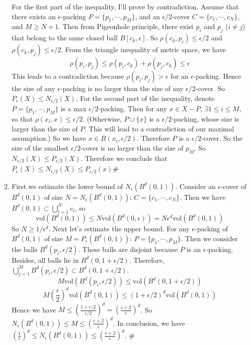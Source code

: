 \documentclass[twoside,11pt]{homework}
\begin{document}
\begin{enumerate}
      For the first part of the inequality, I'll prove by contradiction. Assume that there exists an $\epsilon$-packing $P=\{p_1,\cdots,p_M\}$, and an $\epsilon/2$-cover $C = \{c_1, \cdots,c_N \}$, and $M \geq N+1$. Then from Pigeonhole principle, there exist $p_i$ and $p_j$ ($i \neq j$) that belong to the same closed ball $B[c_k, \epsilon]$. So $\rho(c_k, p_i) \leq \epsilon/2$ and $\rho(c_k, p_j) \leq \epsilon/2$. From the triangle inequality of metric space, we have
      $$\rho(p_i,p_j)\leq \rho(p_i,c_k)+\rho(p_j,c_k) \leq \epsilon$$
      This leads to a contradiction because $\rho(p_i,p_j)>\epsilon$ for an $\epsilon$-packing. Hence the size of any $\epsilon$-packing is no larger than the size of any $\epsilon/2$-cover. So $P_\epsilon (X) \leq N_{\epsilon/2} (X)$.
      \newline
      \newline
      For the second part of the inequality, denote $P =\{p_1,\cdots,p_M\}$ is a max $\epsilon/2$-packing. Then for any $x \in X - P$, $\exists 1 \leq i \leq M $, so that $\rho(x_i, x) \leq \epsilon/2$. (Otherwise, $P\cup \{x\}$ is a $\epsilon/2$-packing, whose size is larger than the size of $P$. This will lead to a contradiction of our maximal assumption.) So we have $x \in B(x_i, \epsilon / 2)$. Therefore $P$ is a $\epsilon /2$-cover. So the size of the smallest $\epsilon/2$-cover is no larger than the size of $p_M$. So $N_{\epsilon/2}(X) \leq P_{\epsilon/2}(X)$. 
      \newline\newline
      Therefore we conclude that $P_\epsilon(X) \leq N_{\epsilon/2} (X) \leq P_{\epsilon/2}(x)$\#
        
        
    \newpage
    \item
    First we estimate the lower bound of $N_\epsilon (B^d(0,1))$.\newline
    Consider an $\epsilon$-cover of $B^d(0,1)$ of size $N=N_\epsilon (B^d(0,1))$: $C = \{c_1,\cdots,c_N\}$. Then we have $B^d(0,1) \subset \bigcup_{i=1}^N c_i$, so
    $$\text{vol}(B^d(0,1)) \leq N \text{vol}(B^d(0,\epsilon)) = N\epsilon^d \text{vol}(B^d(0,1))$$
    So $N \geq 1/\epsilon^d$.
    \newline
    \newline
    Next let's estimate the upper bound.\newline
    For any $\epsilon$-packing of $B^d(0,1)$ of size $M=P_\epsilon (B^d(0,1))$: $P=\{p_1,\cdots,p_M\}$. Then we consider the balls $B^d (p_i, \epsilon/2)$. These balls are disjoint because $P$ is an $\epsilon$-packing. Besides, all balls lie in $B^d (0, 1+\epsilon/2)$. Therefore, $\bigcup_{j=1}^M B^d(p_i, \epsilon/2) \subset B^d(0, 1+\epsilon/2)$.
    $$M \text{vol} (B^d(p_i, \epsilon/2)) \leq \text{vol} (B^d(0,1+\epsilon/2))$$
    $$M(\frac{\epsilon}{2})^d \text{vol}(B^d(0,1)) \leq (1+\epsilon/2)^d \text{vol}(B^d(0,1))$$
    Hence we have $M \leq (\frac{1+\epsilon/2}{\epsilon/2})^d = (\frac{\epsilon+2}{\epsilon})^d$. So $N_\epsilon (B^d(0,1)) \leq M \leq (\frac{\epsilon+2}{\epsilon})^d$.
    \newline
    \newline
    In conclusion, we have $(\frac{1}{\epsilon})^d \leq N_\epsilon (B^d(0,1))  \leq (\frac{\epsilon+2}{\epsilon})^d$. \#
    

\end{enumerate}
\end{document}

